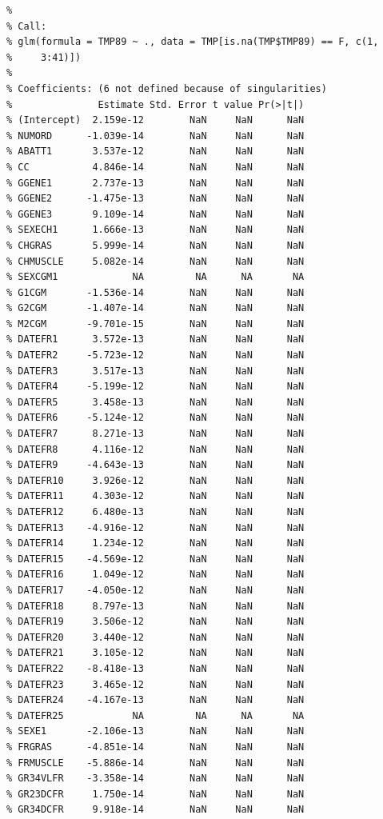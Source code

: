 \documentclass[
]{article}
\begin{document}
\begin{verbatim}
% 
% Call:
% glm(formula = TMP89 ~ ., data = TMP[is.na(TMP$TMP89) == F, c(1, 
%     3:41)])
% 
% Coefficients: (6 not defined because of singularities)
%               Estimate Std. Error t value Pr(>|t|)
% (Intercept)  2.159e-12        NaN     NaN      NaN
% NUMORD      -1.039e-14        NaN     NaN      NaN
% ABATT1       3.537e-12        NaN     NaN      NaN
% CC           4.846e-14        NaN     NaN      NaN
% GGENE1       2.737e-13        NaN     NaN      NaN
% GGENE2      -1.475e-13        NaN     NaN      NaN
% GGENE3       9.109e-14        NaN     NaN      NaN
% SEXECH1      1.666e-13        NaN     NaN      NaN
% CHGRAS       5.999e-14        NaN     NaN      NaN
% CHMUSCLE     5.082e-14        NaN     NaN      NaN
% SEXCGM1             NA         NA      NA       NA
% G1CGM       -1.536e-14        NaN     NaN      NaN
% G2CGM       -1.407e-14        NaN     NaN      NaN
% M2CGM       -9.701e-15        NaN     NaN      NaN
% DATEFR1      3.572e-13        NaN     NaN      NaN
% DATEFR2     -5.723e-12        NaN     NaN      NaN
% DATEFR3      3.517e-13        NaN     NaN      NaN
% DATEFR4     -5.199e-12        NaN     NaN      NaN
% DATEFR5      3.458e-13        NaN     NaN      NaN
% DATEFR6     -5.124e-12        NaN     NaN      NaN
% DATEFR7      8.271e-13        NaN     NaN      NaN
% DATEFR8      4.116e-12        NaN     NaN      NaN
% DATEFR9     -4.643e-13        NaN     NaN      NaN
% DATEFR10     3.926e-12        NaN     NaN      NaN
% DATEFR11     4.303e-12        NaN     NaN      NaN
% DATEFR12     6.480e-13        NaN     NaN      NaN
% DATEFR13    -4.916e-12        NaN     NaN      NaN
% DATEFR14     1.234e-12        NaN     NaN      NaN
% DATEFR15    -4.569e-12        NaN     NaN      NaN
% DATEFR16     1.049e-12        NaN     NaN      NaN
% DATEFR17    -4.050e-12        NaN     NaN      NaN
% DATEFR18     8.797e-13        NaN     NaN      NaN
% DATEFR19     3.506e-12        NaN     NaN      NaN
% DATEFR20     3.440e-12        NaN     NaN      NaN
% DATEFR21     3.105e-12        NaN     NaN      NaN
% DATEFR22    -8.418e-13        NaN     NaN      NaN
% DATEFR23     3.465e-12        NaN     NaN      NaN
% DATEFR24    -4.167e-13        NaN     NaN      NaN
% DATEFR25            NA         NA      NA       NA
% SEXE1       -2.106e-13        NaN     NaN      NaN
% FRGRAS      -4.851e-14        NaN     NaN      NaN
% FRMUSCLE    -5.886e-14        NaN     NaN      NaN
% GR34VLFR    -3.358e-14        NaN     NaN      NaN
% GR23DCFR     1.750e-14        NaN     NaN      NaN
% GR34DCFR     9.918e-14        NaN     NaN      NaN

\end{verbatim}
\end{document}

